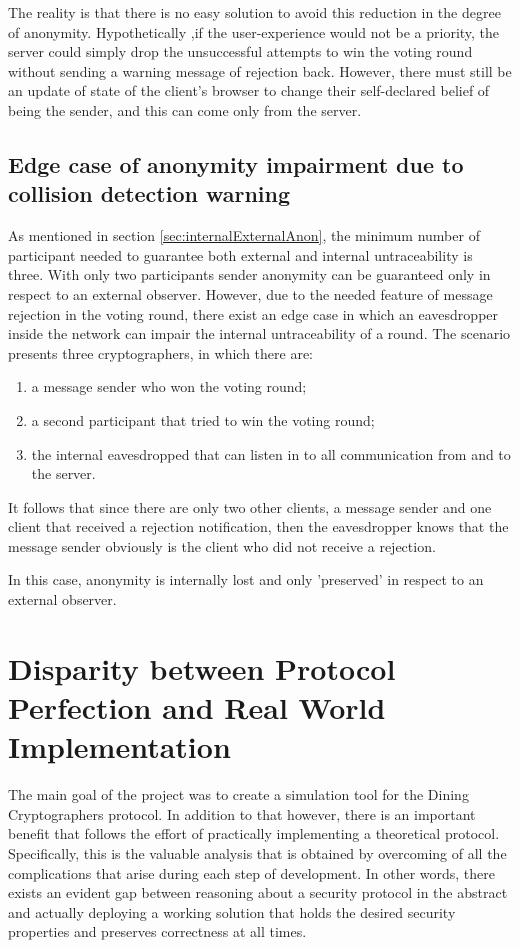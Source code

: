 The reality is that there is no easy solution to avoid this reduction in the degree of anonymity. Hypothetically ,if the user-experience would not be a priority, the server could simply drop the unsuccessful attempts to win the voting round without sending a warning message of rejection back. However, there must still be an update of state of the client's browser to change their self-declared belief of being the sender, and this can come only from the server.

\subsection{Edge case of anonymity impairment due to collision detection warning} \label{sec:anonymityImpairmentEdgeCase}
As mentioned in section \ref{sec:internalExternalAnon}, the minimum number of participant needed to guarantee both external and internal untraceability is three. With only two participants sender anonymity can be guaranteed only in respect to an external observer. However, due to the needed feature of message rejection in the voting round, there exist an edge case in which an eavesdropper inside the network can impair the internal untraceability of a round. The scenario presents three cryptographers, in which there are:
\begin{enumerate}
    \item a message sender who won the voting round;
    \item a second participant that tried to win the voting round;
    \item the internal eavesdropped that can listen in to all communication from and to the server.
\end{enumerate}
It follows that since there are only two other clients, a message sender and one client that received a rejection notification, then the eavesdropper knows that the message sender obviously is the client who did not receive a rejection.

In this case, anonymity is internally lost and only 'preserved' in respect to an external observer.


\section{Disparity between Protocol Perfection and Real World Implementation}
The main goal of the project was to create a simulation tool for the Dining Cryptographers protocol. In addition to that however, there is an important benefit that follows the effort of practically implementing a theoretical protocol. Specifically, this is the valuable analysis that is obtained by overcoming of all the complications that arise during each step of development. In other words, there exists an evident gap between reasoning about a security protocol in the abstract and actually deploying a working solution that holds the desired security properties and preserves correctness at all times.

